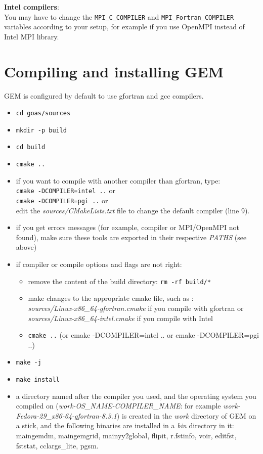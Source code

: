 \documentclass[11pt]{book}
\begin{document}
\textbf{Intel compilers}:\\
You may have to change the \texttt{MPI\_C\_COMPILER} and
\texttt{MPI\_Fortran\_COMPILER} variables according to your setup, for
example if you use OpenMPI instead of Intel MPI library.

\section{Compiling and installing GEM}
\label{building-gem}

GEM is configured by default to use gfortran and gcc compilers.

\begin{itemize}
\item \texttt{cd goas/sources}
\item \texttt{mkdir -p build}
\item \texttt{cd build}
\item \texttt{cmake ..}
\item if you want to compile with another compiler than gfortran, type:\\
  \texttt{cmake -DCOMPILER=intel ..} or\\
  \texttt{cmake -DCOMPILER=pgi ..}  or \\
  edit the \textit{sources/CMakeLists.txt} file to change the default
  compiler (line 9).
\item if you get errors messages (for example, compiler or MPI/OpenMPI not found), make
  sure these tools are exported in their respective \textit{PATHS} (see above)
\item if compiler or compile options and flags are not right:
\begin{itemize}
\item remove the content of the build directory: \texttt{rm -rf build/*}
\item make changes to the appropriate cmake file, such as : \\
  \textit{sources/Linux-x86\_64-gfortran.cmake} if you compile with gfortran or \\
  \textit{sources/Linux-x86\_64-intel.cmake} if you compile with Intel
\item \texttt{cmake ..} (or cmake -DCOMPILER=intel .. or cmake -DCOMPILER=pgi ..)
\end{itemize} 
\item \texttt{make -j}
\item \texttt{make install}
\item a directory named after the compiler you used, and the operating
  system you compiled on (\textit{work-OS\_NAME-COMPILER\_NAME}: for example
  \textit{work-Fedora-29\_x86-64-gfortran-8.3.1}) is created in the
  \textit{work} directory of GEM on a stick, and the following binaries are
  installed in a \textit{bin} directory in it: maingemdm, maingemgrid,
  mainyy2global, flipit, r.fstinfo, voir, editfst, fststat, cclargs\_lite,
  pgsm.
\end{itemize}
\end{document}
